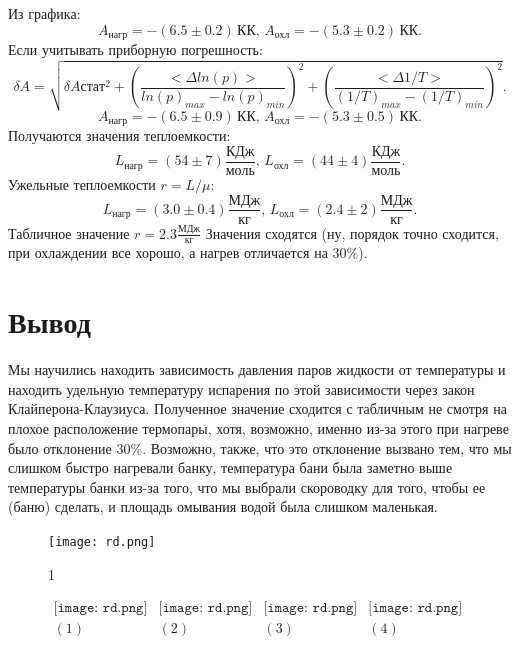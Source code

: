 Из графика:
$$A_\text{нагр} = -(6.5\pm0.2)\,\text{КК},\,A_\text{охл} = -(5.3\pm0.2)\,\text{КК}.$$
Если учитывать приборную погрешность:
$$\delta A = \sqrt{\delta A{стат}^2 + \left(\frac{<\Delta ln(p)>}{ln(p)_{max} - ln(p)_{min}}\right)^2 + \left(\frac{<\Delta 1/T>}{(1/T)_{max} - (1/T)_{min}}\right)^2}.$$
$$A_\text{нагр} = -(6.5\pm0.9)\,\text{КК},\,A_\text{охл} = -(5.3\pm0.5)\,\text{КК}.$$
Получаются значения теплоемкости:
$$L_\text{нагр} = (54\pm7)\frac{\text{КДж}}{\text{моль}},\,L_\text{охл} = (44\pm4)\frac{\text{КДж}}{\text{моль}}.$$
Ужельные теплоемкости $r=L/\mu$:
$$L_\text{нагр} = (3.0\pm0.4)\frac{\text{МДж}}{\text{кг}},\,L_\text{охл} = (2.4\pm2)\frac{\text{МДж}}{\text{кг}}.$$
Табличное значение $r=2.3\frac{\text{МДж}}{\text{кг}}$ Значения сходятся (ну, порядок точно сходится, при охлаждении все хорошо, а нагрев отличается на $30\%$).
\section*{Вывод}
Мы научились находить зависимость давления паров жидкости от температуры и находить удельную температуру испарения по этой зависимости через закон Клайперона-Клаузиуса. Полученное значение сходится с табличным не смотря на плохое расположение термопары, хотя, возможно, именно из-за этого при нагреве было отклонение $30\%$. Возможно, также, что это отклонение вызвано тем, что мы слишком быстро нагревали банку, температура бани была заметно выше температуры банки из-за того, что мы выбрали скороводку для того, чтобы ее (баню) сделать, и площадь омывания водой была слишком маленькая.









\lipsum[1-4]
\begin{figure}
\centering
\texttt{[image: rd.png]}
\caption{1}
\end{figure}
\lipsum[1-6]


\begin{figure}[h]
\begin{center}$
\begin{array}{cccc}
\texttt{[image: rd.png]}&
\texttt{[image: rd.png]}&
\texttt{[image: rd.png]}&
\texttt{[image: rd.png]}\\
(1) & (2) & (3) & (4)
\end{array}$
\end{center}
\end{figure}
